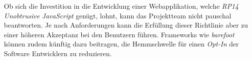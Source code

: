 Ob sich die Investition in die Entwicklung einer Webapplikation, welche \emph{RP14 Unobtrusive JavaScript} genügt, lohnt, kann das Projektteam nicht pauschal beantworten. Je nach Anforderungen kann die Erfüllung dieser Richtlinie aber zu einer höheren Akzeptanz bei den Benutzern führen. Frameworks wie \emph{barefoot} können zudem künftig dazu beitragen, die Hemmschwelle für einen \emph{Opt-In} der Software Entwicklern zu reduzieren.
